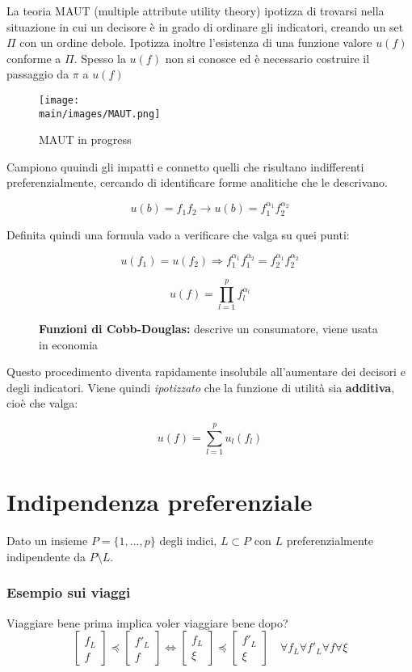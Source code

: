 \documentclass[\main/main.tex]{subfiles}
\begin{document}
La teoria MAUT (multiple attribute utility theory) ipotizza di trovarsi nella situazione in cui un decisore è in grado di ordinare gli indicatori, creando un set $\Pi$ con un ordine debole. Ipotizza inoltre l'esistenza di una funzione valore $u(f)$ conforme a $\Pi$. Spesso la $u(f)$ non si conosce ed è necessario costruire il passaggio da $\pi$ a $u(f)$

\begin{figure}[H]
  \centering
  \texttt{[image: \\main/images/MAUT.png]}
  \caption{MAUT in progress}
\end{figure}

Campiono quuindi gli impatti e connetto quelli che risultano indifferenti preferenzialmente, cercando di identificare forme analitiche che le descrivano.

\[
  u(b) = f_1f_2 \rightarrow u(b) = f_1^{\alpha_{1}}f_2^{\alpha_{2}}
\]

Definita quindi una formula vado a verificare che valga su quei punti:

\[
  u(f_1) = u(f_2) \Rightarrow  f_1^{\alpha_{1}}f_1^{\alpha_{2}} = f_2^{\alpha_{1}}f_2^{\alpha_{2}}
\]

\begin{figure}[H]
  \[
    u(f) = \prod_{l=1}^p f_l^{\alpha_l}
  \]
  \caption{\textbf{Funzioni di Cobb-Douglas:} descrive un consumatore, viene usata in economia}
\end{figure}

Questo procedimento diventa rapidamente insolubile all'aumentare dei decisori e degli indicatori. Viene quindi \textit{ipotizzato} che la funzione di utilità sia \textbf{additiva}, cioè che valga:

\[
  u(f) = \sum_{l=1}^p u_l(f_l)
\]

\section{Indipendenza preferenziale}
Dato un insieme $P = \{1, \dots, p\}$ degli indici, $L \subset P$ con $L$ preferenzialmente indipendente da $P \setminus L$.

\subsubsection{Esempio sui viaggi}
Viaggiare bene prima implica voler viaggiare bene dopo?
\[
  \begin{bmatrix}
    f_L \\
    f
  \end{bmatrix}
  \preceq
  \begin{bmatrix}
    f'_L \\
    f
  \end{bmatrix}
  \Leftrightarrow
  \begin{bmatrix}
    f_L \\
    \xi
  \end{bmatrix}
  \preceq
  \begin{bmatrix}
    f'_L \\
    \xi
  \end{bmatrix}
  \quad
  \forall f_L \forall f'_L \forall f \forall \xi
\]
\end{document}
